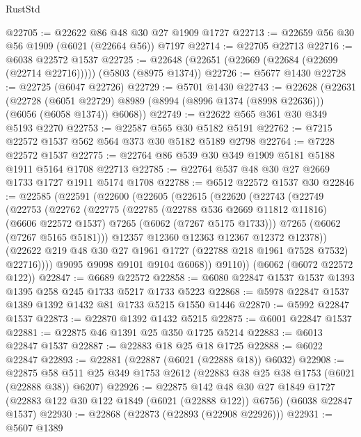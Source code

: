 \begin{lexlean}{RustStd}
\begin{coremodule}
@22705 := @22622 @86 @48 @30 @27 @1909 @1727
@22713 := @22659 @56 @30 @56 @1909 (@6021 (@22664 @56)) @7197
@22714 := @22705 @22713
@22716 := @6038 @22572 @1537
@22725 := @22648 (@22651 (@22669 (@22684 (@22699 (@22714 @22716))))) (@5803 (@8975 @1374))
@22726 := @5677 @1430
@22728 := @22725 (@6047 @22726)
@22729 := @5701 @1430
@22743 := @22628
    (@22631
      (@22728
        (@6051 @22729)
        @8989
        (@8994 (@8996 @1374 (@8998 @22636)))
        (@6056 (@6058 @1374))
        @6068))
@22749 := @22622 @565 @361 @30 @349 @5193 @2270
@22753 := @22587 @565 @30 @5182 @5191
@22762 := @7215 @22572 @1537 @562 @564 @373 @30 @5182 @5189 @2798
@22764 := @7228 @22572 @1537
@22775 := @22764 @86 @539 @30 @349 @1909 @5181 @5188 @1911 @5164 @1708 @22713
@22785 := @22764 @537 @48 @30 @27 @2669 @1733 @1727 @1911 @5174 @1708
@22788 := @6512 @22572 @1537 @30
@22846 := @22585
    (@22591
      (@22600
        (@22605
          (@22615
            (@22620
              (@22743
                (@22749
                  (@22753
                    (@22762
                      (@22775
                        (@22785
                          (@22788 @536 @2669 @11812 @11816)
                          (@6606 @22572 @1537)
                          @7265
                          (@6062 (@7267 @5175 @1733)))
                        @7265
                        (@6062 (@7267 @5165 @5181)))
                      @12357
                      @12360
                      @12363
                      @12367
                      @12372
                      @12378))
                  (@22622 @219 @48 @30 @27 @1961 @1727 (@22788 @218 @1961 @7528 @7532) @22716))))
            @9095
            @9098
            @9101
            @9104
            @6068))
        @9110))
    (@6062 (@6072 @22572 @122))
@22847 := @6689 @22572
@22858 := @6080 @22847 @1537 @1537 @1393 @1395 @258 @245 @1733 @5217 @1733 @5223
@22868 := @5978 @22847 @1537 @1389 @1392 @1432 @81 @1733 @5215 @1550 @1446
@22870 := @5992 @22847 @1537
@22873 := @22870 @1392 @1432 @5215
@22875 := @6001 @22847 @1537
@22881 := @22875 @46 @1391 @25 @350 @1725 @5214
@22883 := @6013 @22847 @1537
@22887 := @22883 @18 @25 @18 @1725
@22888 := @6022 @22847
@22893 := @22881 (@22887 (@6021 (@22888 @18)) @6032)
@22908 := @22875 @58 @511 @25 @349 @1753 @2612 (@22883 @38 @25 @38 @1753 (@6021 (@22888 @38)) @6207)
@22926 := @22875
    @142
    @48
    @30
    @27
    @1849
    @1727
    (@22883 @122 @30 @122 @1849 (@6021 (@22888 @122)) @6756)
    (@6038 @22847 @1537)
@22930 := @22868 (@22873 (@22893 (@22908 @22926)))
@22931 := @5607 @1389

\end{coremodule}
\end{lexlean}

